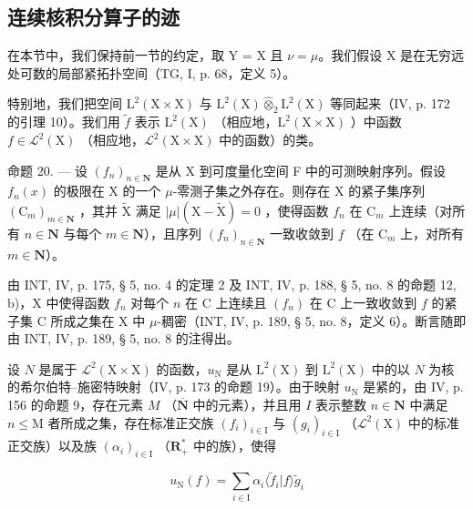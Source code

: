 \subsection{连续核积分算子的迹}

在本节中，我们保持前一节的约定，取 Y = X 且 \(\nu = \mu\)。我们假设 X 是在无穷远处可数的局部紧拓扑空间（TG, I, p. 68，定义 5）。

特别地，我们把空间 \(\mathrm{L}^{2}(\mathrm{X}\times\mathrm{X})\) 与 \(\mathrm{L}^{2}(\mathrm{X})\widehat{\otimes}_{2}\mathrm{L}^{2}(\mathrm{X})\) 等同起来（IV, p. 172 的引理 10）。我们用 \(\widetilde{f}\) 表示 \(\mathrm{L}^{2}(\mathrm{X})\) （相应地，\(\mathrm{L}^{2}(\mathrm{X}\times\mathrm{X})\) ）中函数 \(f\in\mathcal{L}^{2}(\mathrm{X})\) （相应地，\(\mathcal{L}^{2}(\mathrm{X}\times\mathrm{X})\) 中的函数）的类。

命题 20. --- 设 \((f_n)_{n \in \mathbf{N}}\) 是从 X 到可度量化空间 F 中的可测映射序列。假设 \(f_n(x)\) 的极限在 X 的一个 \(\mu\)-零测子集之外存在。则存在 X 的紧子集序列 \((\mathrm{C}_m)_{m \in \mathbf{N}}\) ，其并 \(\widetilde{\mathrm{X}}\) 满足 \(|\mu|(\mathrm{X} - \widetilde{\mathrm{X}}) = 0\) ，使得函数 \(f_n\) 在 \(\mathrm{C}_m\) 上连续（对所有 \(n \in \mathbf{N}\) 与每个 \(m \in \mathbf{N}\)），且序列 \((f_n)_{n \in \mathbf{N}}\) 一致收敛到 \(f\) （在 \(\mathrm{C}_m\) 上，对所有 \(m \in \mathbf{N}\)）。

由 INT, IV, p. 175, § 5, no. 4 的定理 2 及 INT, IV, p. 188, § 5, no. 8 的命题 12, b)，X 中使得函数 \(f_n\) 对每个 \(n\) 在 C 上连续且 \((f_n)\) 在 C 上一致收敛到 \(f\) 的紧子集 C 所成之集在 X 中 \(\mu\)-稠密（INT, IV, p. 189, § 5, no. 8，定义 6）。断言随即由 INT, IV, p. 189, § 5, no. 8 的注得出。

设 \(N\) 是属于 \(\mathcal{L}^2 (\mathrm{X}\times \mathrm{X})\) 的函数，\(u_{\mathrm{N}}\) 是从 \(\mathrm{L}^2 (\mathrm{X})\) 到 \(\mathrm{L}^2 (\mathrm{X})\) 中的以 \(N\) 为核的希尔伯特--施密特映射（IV, p. 173 的命题 19）。由于映射 \(u_{\mathrm{N}}\) 是紧的，由 IV, p. 156 的命题 9，存在元素 \(M\) （\(\overline{\mathbf{N}}\) 中的元素），并且用 \(I\) 表示整数 \(n\in \mathbf{N}\) 中满足 \(n\leqslant \mathrm{M}\) 者所成之集，存在标准正交族 \((f_i)_{i\in \mathrm{I}}\) 与 \((g_{i})_{i\in \mathrm{I}}\) （\(\mathcal{L}^2 (\mathrm{X})\) 中的标准正交族）以及族 \((\alpha_{i})_{i\in \mathrm{I}}\) （\(\mathbf{R}_+^*\) 中的族），使得

\[
u _ {\mathrm{N}} (f) = \sum_ {i \in \mathrm{I}} \alpha_ {i} \langle \widetilde {f} _ {i} | f \rangle \widetilde {g} _ {i}\tag{13}
\]

